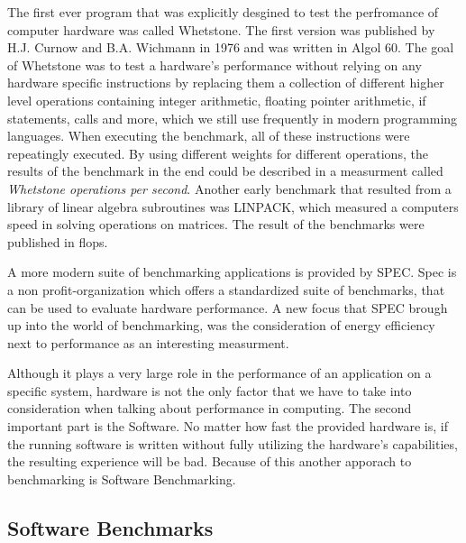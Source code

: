 The first ever program that was explicitly desgined to test the perfromance of computer hardware was called Whetstone. The first version was published by H.J. Curnow and B.A. Wichmann in 1976 and was written in Algol 60. The goal of Whetstone was to test a hardware's performance without relying on any hardware specific instructions by replacing them a collection of different higher level operations containing integer arithmetic, floating pointer arithmetic, if statements, calls and more, which we still use frequently in modern programming languages. When executing the benchmark, all of these instructions were repeatingly executed. By using different weights for different operations, the results of the benchmark in the end could be described in a measurment called \emph{Whetstone operations per second}.
Another early benchmark that resulted from a library of linear algebra subroutines was LINPACK, which measured a computers speed in solving operations on matrices. The result of the benchmarks were published in \gls{flops}.
\cite{OverviewBenchmarks}

A more modern suite of benchmarking applications is provided by SPEC. Spec is a non profit-organization which offers a standardized suite of benchmarks, that can be used to evaluate hardware performance. A new focus that SPEC brough up into the world of benchmarking, was the consideration of energy efficiency next to performance as an interesting measurment.
\cite{Spec}

Although it plays a very large role in the performance of an application on a specific system, hardware is not the only factor that we have to take into consideration when talking about performance in computing. The second important part is the Software. No matter how fast the provided hardware is, if the running software is written without fully utilizing the hardware's capabilities, the resulting experience will be bad.
Because of this another apporach to benchmarking is Software Benchmarking.





\subsection{Software Benchmarks}

